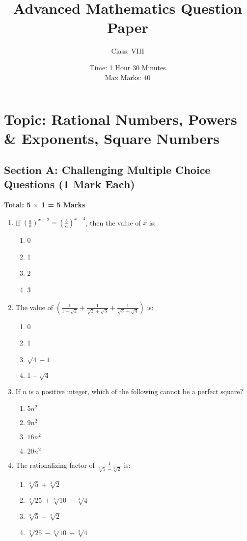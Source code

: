 \documentclass[12pt]{article}
\title{Advanced Mathematics Question Paper}
\author{Class: VIII}
\date{Time: 1 Hour 30 Minutes \\ Max Marks: 40}
\begin{document}
	
	\maketitle
	
	\section*{Topic: Rational Numbers, Powers \& Exponents, Square Numbers}
	
	\subsection*{Section A: Challenging Multiple Choice Questions (1 Mark Each)}
	\textbf{Total: 5 $\times$ 1 = 5 Marks}
	
	\begin{enumerate}[label=\arabic*.]
		\item If $\left( \frac{a}{b} \right)^{x-2} = \left( \frac{b}{a} \right)^{x-4}$, then the value of $x$ is:
		\begin{enumerate}[label=\alph*)]
			\item 0
			\item 1
			\item 2
			\item 3
		\end{enumerate}
		
		\item The value of $\left( \frac{1}{1 + \sqrt{2}} + \frac{1}{\sqrt{2} + \sqrt{3}} + \frac{1}{\sqrt{3} + \sqrt{4}} \right)$ is:
		\begin{enumerate}[label=\alph*)]
			\item 0
			\item 1
			\item $\sqrt{4} - 1$
			\item $1 - \sqrt{4}$
		\end{enumerate}
		
		\item If $n$ is a positive integer, which of the following cannot be a perfect square?
		\begin{enumerate}[label=\alph*)]
			\item $5n^2$
			\item $9n^2$
			\item $16n^2$
			\item $20n^2$
		\end{enumerate}
		
		\item The rationalizing factor of $\frac{1}{\sqrt[3]{5} - \sqrt[3]{2}}$ is:
		\begin{enumerate}[label=\alph*)]
			\item $\sqrt[3]{5} + \sqrt[3]{2}$
			\item $\sqrt[3]{25} + \sqrt[3]{10} + \sqrt[3]{4}$
			\item $\sqrt[3]{5} - \sqrt[3]{2}$
			\item $\sqrt[3]{25} - \sqrt[3]{10} + \sqrt[3]{4}$
		\end{enumerate}
		

\end{enumerate}
\end{document}
